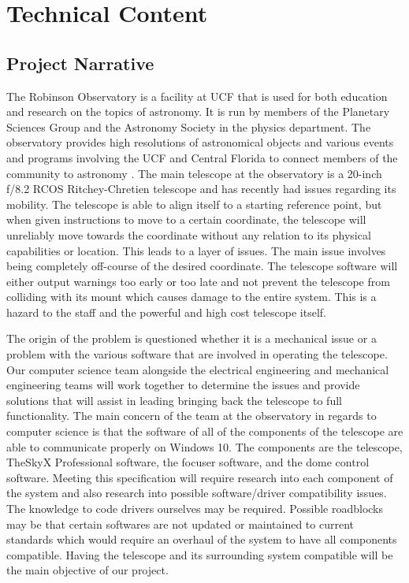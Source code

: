 \documentclass[12pt]{report}
\begin{document}
\section*{Technical Content}

\subsection*{Project Narrative}

The Robinson Observatory is a facility at UCF that is used for both education and research on the topics of astronomy.  It is run by members of the Planetary Sciences Group and the Astronomy Society in the physics department.  The observatory provides high resolutions of astronomical objects and various events and programs involving the UCF and Central Florida to connect members of the community to astronomy .  The main telescope at the observatory is a 20-inch f/8.2 RCOS Ritchey-Chretien telescope and has recently had issues regarding its mobility.  The telescope is able to align itself to a starting reference point, but when given instructions to move to a certain coordinate, the telescope will unreliably move towards the coordinate without any relation to its physical capabilities or location.  This leads to a layer of issues.  The main issue involves being completely off-course of the desired coordinate.  The telescope software will either output warnings too early or too late and not prevent the telescope from colliding with its mount which causes damage to the entire system.  This is a hazard to the staff and the powerful and high cost telescope itself.

The origin of the problem is questioned whether it is a mechanical issue or a problem with the various software that are involved in operating the telescope.  Our computer science team alongside the electrical engineering and mechanical engineering teams will work together to determine the issues and provide solutions that will assist in leading bringing back the telescope to full functionality.  The main concern of the team at the observatory in regards to computer science is that the software of all of the components of the telescope are able to communicate properly on Windows 10.  The components are the telescope, TheSkyX Professional software, the focuser software, and the dome control software.  Meeting this specification will require research into each component of the system and also research into possible software/driver compatibility issues.  The knowledge to code drivers ourselves may be required.  Possible roadblocks may be that certain softwares are not updated or maintained to current standards which would require an overhaul of the system to have all components compatible.  Having the telescope and its surrounding system compatible will be the main objective of our project.
\end{document}

